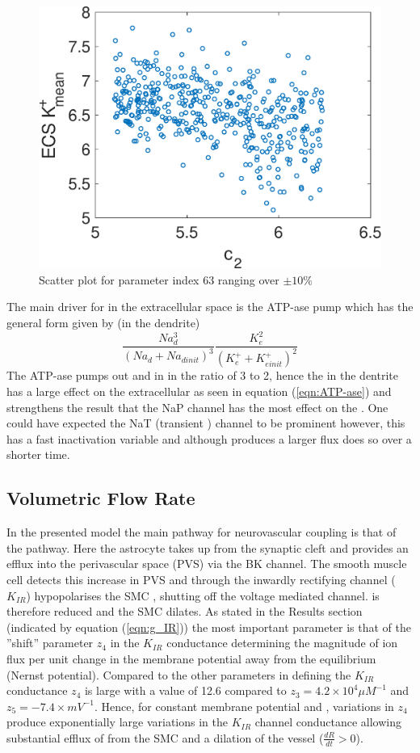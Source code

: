 \begin{figure}
\centering
\includegraphics[width=0.7\linewidth]{Figures/Scatter_63_K_ECS}
\caption{Scatter plot for parameter index 63 ranging over $\pm 10\%$}
\label{fig:scatter63kecs}
\end{figure}
The main driver for \pot in the extracellular space is the \pot \na ATP-ase pump which has the general form given by (in the dendrite)  
\begin{equation}\label{eqn:ATP-ase}
\frac{Na_d^3}{\left( Na_d+Na_{d init}\right)^3}\frac{K^{2}_e}{\left( K^+_e +K^+_{e init}\right) ^2}
\end{equation}
The ATP-ase pumps out \na and in \pot in the ratio of 3 to 2, hence the \na in the dentrite has a large effect on the extracellular \pot as seen in equation (\ref{eqn:ATP-ase}) and strengthens the result that the NaP channel has the most effect on the \pot. One could have expected the NaT (transient \na) channel to be prominent however, this has a fast inactivation variable and although produces a larger flux does so over a shorter time.  
\subsection{Volumetric Flow Rate}
In the presented model the main pathway for neurovascular coupling is that of the \pot pathway. Here the astrocyte takes up \pot from the synaptic cleft and provides an efflux into the perivascular space (PVS) via the BK channel. The smooth muscle cell detects this increase in PVS \pot and through the inwardly rectifying channel ($K_{IR}$) hypopolarises the SMC , shutting off the voltage mediated \ca channel.  \ca is therefore reduced and the SMC dilates. As stated in the Results section (indicated by equation (\ref{eqn:g_IR})) the most important parameter is that of the ''shift'' parameter $z_4$ in the $K_{IR}$ conductance determining the magnitude of ion flux per unit change in the membrane potential away from the equilibrium (Nernst potential).  Compared to the other parameters in defining the $K_{IR}$ conductance $z_4$ is large with a value of 12.6 compared to $z_3=4.2 \times 10^{4} \mu M^{-1}$ and $z_5 = -7.4 \times mV^{-1}$. Hence, for constant membrane potential and \pot,   variations in $z_4$ produce exponentially large variations in the $K_{IR}$ channel conductance allowing substantial efflux of \ca from the SMC and a dilation of the vessel ($\frac{dR}{dt}> 0$). \\

